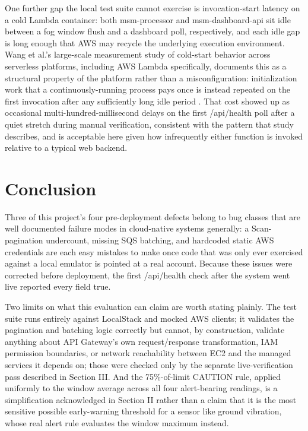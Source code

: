 \documentclass[conference]{IEEEtran}
\begin{document}
One further gap the local test suite cannot exercise is invocation-start latency on a cold Lambda container: both msm-processor and msm-dashboard-api sit idle between a fog window flush and a dashboard poll, respectively, and each idle gap is long enough that AWS may recycle the underlying execution environment. Wang et al.'s large-scale measurement study of cold-start behavior across serverless platforms, including AWS Lambda specifically, documents this as a structural property of the platform rather than a misconfiguration: initialization work that a continuously-running process pays once is instead repeated on the first invocation after any sufficiently long idle period \cite{ref8}. That cost showed up as occasional multi-hundred-millisecond delays on the first /api/health poll after a quiet stretch during manual verification, consistent with the pattern that study describes, and is acceptable here given how infrequently either function is invoked relative to a typical web backend.

\section{Conclusion}

Three of this project's four pre-deployment defects belong to bug classes that are well documented failure modes in cloud-native systems generally: a Scan-pagination undercount, missing SQS batching, and hardcoded static AWS credentials are each easy mistakes to make once code that was only ever exercised against a local emulator is pointed at a real account. Because these issues were corrected before deployment, the first /api/health check after the system went live reported every field true.

Two limits on what this evaluation can claim are worth stating plainly. The test suite runs entirely against LocalStack and mocked AWS clients; it validates the pagination and batching logic correctly but cannot, by construction, validate anything about API Gateway's own request/response transformation, IAM permission boundaries, or network reachability between EC2 and the managed services it depends on; those were checked only by the separate live-verification pass described in Section III. And the 75\%-of-limit CAUTION rule, applied uniformly to the window average across all four alert-bearing readings, is a simplification acknowledged in Section II rather than a claim that it is the most sensitive possible early-warning threshold for a sensor like ground vibration, whose real alert rule evaluates the window maximum instead.
\end{document}
